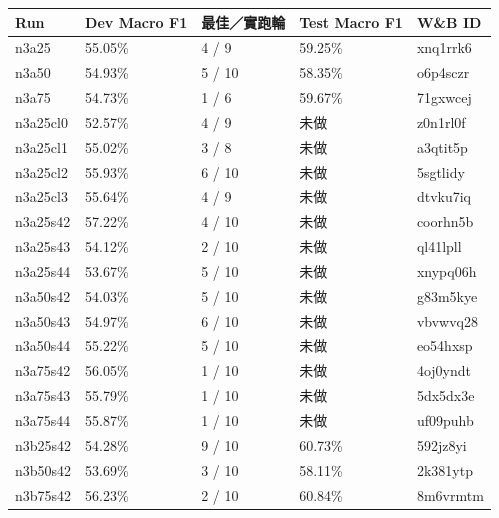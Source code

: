 \begin{tabular}{lllll}
\toprule
Run & Dev Macro F1 & 最佳／實跑輪 & Test Macro F1 & W\&B ID\\
\midrule
n3a25 & 55.05\% & 4 / 9 & 59.25\% & xnq1rrk6\\
n3a50 & 54.93\% & 5 / 10 & 58.35\% & o6p4sczr\\
n3a75 & 54.73\% & 1 / 6 & 59.67\% & 71gxwcej\\
n3a25cl0 & 52.57\% & 4 / 9 & 未做 & z0n1rl0f\\
n3a25cl1 & 55.02\% & 3 / 8 & 未做 & a3qtit5p\\
n3a25cl2 & 55.93\% & 6 / 10 & 未做 & 5sgtlidy\\
n3a25cl3 & 55.64\% & 4 / 9 & 未做 & dtvku7iq\\
n3a25s42 & 57.22\% & 4 / 10 & 未做 & coorhn5b\\
n3a25s43 & 54.12\% & 2 / 10 & 未做 & ql41lpll\\
n3a25s44 & 53.67\% & 5 / 10 & 未做 & xnypq06h\\
n3a50s42 & 54.03\% & 5 / 10 & 未做 & g83m5kye\\
n3a50s43 & 54.97\% & 6 / 10 & 未做 & vbvwvq28\\
n3a50s44 & 55.22\% & 5 / 10 & 未做 & eo54hxsp\\
n3a75s42 & 56.05\% & 1 / 10 & 未做 & 4oj0yndt\\
n3a75s43 & 55.79\% & 1 / 10 & 未做 & 5dx5dx3e\\
n3a75s44 & 55.87\% & 1 / 10 & 未做 & uf09puhb\\
n3b25s42 & 54.28\% & 9 / 10 & 60.73\% & 592jz8yi\\
n3b50s42 & 53.69\% & 3 / 10 & 58.11\% & 2k381ytp\\
n3b75s42 & 56.23\% & 2 / 10 & 60.84\% & 8m6vrmtm\\
\bottomrule
\end{tabular}
